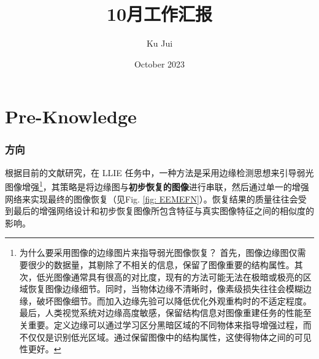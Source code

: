 \documentclass[a4paper, 10pt]{article}
\begin{document}
	
	
	\title{\songti {}10月工作汇报}
	\author{\textrm{Ku Jui}}
	\date{\textrm{October 2023}}
	\maketitle
	
	\renewcommand{\figurename}{Figure} %
	
	\renewcommand{\tablename}{Table}
	
	\renewcommand{\cfttoctitlefont}{\hfill\Large\bfseries\songti}
	\renewcommand{\cftaftertoctitle}{\hfill}
	\renewcommand{\contentsname}{Content}
		
	\tableofcontents
	
	
	\part{Pre-Knowledge}	
	
	\section{方向}
		
		根据目前的文献研究，在 LLIE 任务中，一种方法是采用边缘检测思想来引导弱光图像增强\footnote{为什么要采用图像的边缘图片来指导弱光图像恢复？
		首先，图像边缘图仅需要很少的数据量，其剔除了不相关的信息，保留了图像重要的结构属性。其次，低光图像通常具有很高的对比度，现有的方法可能无法在极暗或极亮的区域恢复图像边缘细节。同时，当物体边缘不清晰时，像素级损失往往会模糊边缘，破坏图像细节。而加入边缘先验可以降低优化外观重构时的不适定程度。最后，人类视觉系统对边缘高度敏感，保留结构信息对图像重建任务的性能至关重要。定义边缘可以通过学习区分黑暗区域的不同物体来指导增强过程，而不仅仅是识别低光区域。通过保留图像中的结构属性，这使得物体之间的可见性更好。}，其策略是将边缘图与\textbf{初步恢复的图像}进行串联，然后通过单一的增强网络来实现最终的图像恢复（见Fig. \ref{fig: EEMEFN}）。恢复结果的质量往往会受到最后的增强网络设计和初步恢复图像所包含特征与真实图像特征之间的相似度的影响。
		
\end{document}
